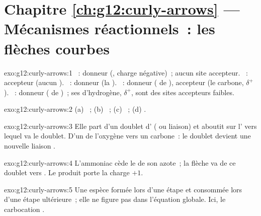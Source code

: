 \section*{Chapitre \ref{ch:g12:curly-arrows} --- Mécanismes réactionnels~: les flèches courbes}

\begin{solution}{exo:g12:curly-arrows:1}
~: donneur (, charge négative)~; aucun site
accepteur. ~: accepteur (aucun ). ~: donneur
(la ). ~: donneur ( de
), accepteur (le carbone,
$\delta^+$). ~: donneur ( de )~; ses
 d'hydrogène,
$\delta^+$, sont des sites accepteurs faibles.
\end{solution}

\begin{solution}{exo:g12:curly-arrows:2}
(a) ~; (b) ~; (c) ~; (d) .
\end{solution}

\begin{solution}{exo:g12:curly-arrows:3}
Elle part d'un doublet d' ( ou liaison) et
aboutit sur l' vers lequel va le doublet. D'un  de
l'oxygène vers un carbone~: le doublet devient une nouvelle liaison
.
\end{solution}

\begin{solution}{exo:g12:curly-arrows:4}
L'ammoniac cède le  de son azote~; la flèche va de ce
doublet vers . Le produit  porte la charge $+1$.
\end{solution}

\begin{solution}{exo:g12:curly-arrows:5}
Une espèce formée lors d'une étape et consommée lors d'une étape
ultérieure~; elle ne figure pas dans l'équation globale. Ici, le
carbocation .
\end{solution}

